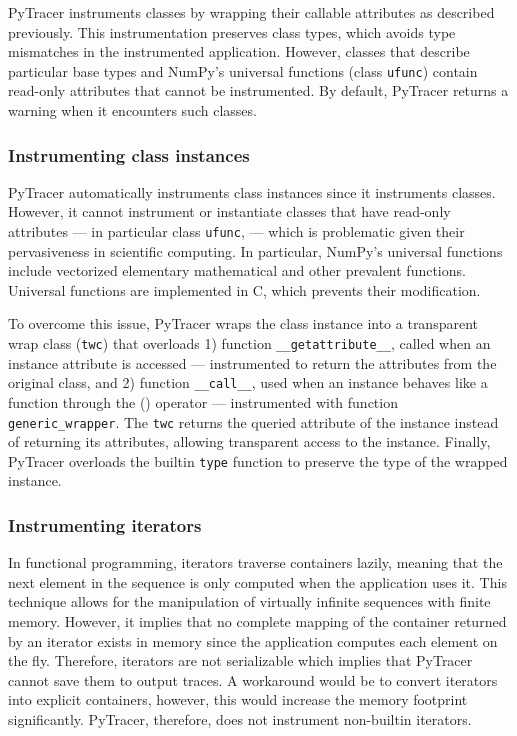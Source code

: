 \documentclass[10pt,journal,compsoc]{IEEEtran}
\newcommand{\pytracer}[0]{PyTracer\xspace}
\begin{document}
\pytracer instruments classes by wrapping their callable attributes as described
previously. This instrumentation preserves class types, which avoids type
mismatches in the instrumented application. However, classes that describe
particular base types and NumPy's universal functions (class \texttt{ufunc})
contain read-only attributes that cannot be instrumented. By default, \pytracer
returns a warning when it encounters such classes. 

\subsubsection{Instrumenting class instances}

\pytracer automatically instruments class instances since it instruments
classes. However, it cannot instrument or instantiate classes that have
read-only attributes --- in particular class \texttt{ufunc}, --- which is
problematic given their pervasiveness in scientific computing. In particular,
NumPy's universal functions include vectorized elementary mathematical and other
prevalent functions. Universal functions are implemented in C, which prevents
their modification.

To overcome this issue, \pytracer wraps the class instance into a transparent
wrap class (\texttt{twc}) that overloads 1) function
\texttt{\_\_getattribute\_\_}, called when an instance attribute is accessed ---
instrumented to return the attributes from the original class, and 2) function
\texttt{\_\_call\_\_}, used when an instance behaves like a function through the
() operator --- instrumented with function \texttt{generic\_wrapper}. The
\texttt{twc} returns the queried attribute of the instance instead of returning
its attributes, allowing transparent access to the instance.  Finally, \pytracer
overloads the builtin \texttt{type} function to preserve the type of the wrapped
instance.

\subsubsection{Instrumenting iterators}

In functional programming, iterators traverse containers lazily, meaning that
the next element in the sequence is only computed when the application uses it.
This technique allows for the manipulation of virtually infinite sequences with
finite memory. However, it implies that no complete mapping of the container
returned by an iterator exists in memory since the application computes each
element on the fly. Therefore, iterators are not serializable which implies that
\pytracer cannot save them to output traces. A workaround would be to convert
iterators into explicit containers, however, this would increase the memory
footprint significantly. \pytracer, therefore, does not instrument non-builtin
iterators. 
\end{document}
